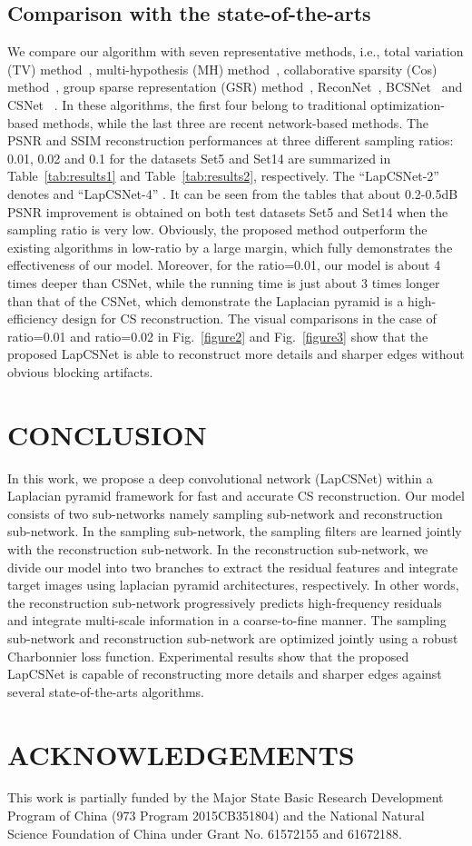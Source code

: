 \documentclass{article}
\begin{document}
\subsection{Comparison with the state-of-the-arts}
\label{sec:typestyle}
We compare our algorithm with seven representative methods, i.e., total variation (TV) method~\cite{li1tval3}, multi-hypothesis (MH) method~\cite{chen2011compressed}, collaborative sparsity (Cos) method~\cite{zhang2012compressed}, group sparse representation (GSR) method~\cite{zhang2014group}, ReconNet~\cite{kulkarni2016reconnet}, BCSNet~\cite{adler2016deep} and CSNet ~\cite{shi2017deep}. In these algorithms, the first four belong to traditional optimization-based methods, while the last three are recent network-based methods. The PSNR and SSIM reconstruction performances at three different sampling ratios: 0.01, 0.02 and 0.1 for the datasets Set5 and Set14 are summarized in Table~\ref{tab:results1} and Table~\ref{tab:results2}, respectively. The ``LapCSNet-2'' denotes  and ``LapCSNet-4'' . It can be seen from the tables that about 0.2-0.5dB PSNR improvement is obtained on both test datasets Set5 and Set14 when the sampling ratio is very low. Obviously, the proposed method outperform the existing algorithms in low-ratio by a large margin, which fully demonstrates the effectiveness of our model. Moreover, for the ratio=0.01, our model is about 4 times deeper than CSNet, while the running time is just about 3 times longer than that of the CSNet, which demonstrate the Laplacian pyramid is a high-efficiency design for CS reconstruction. The visual comparisons in the case of ratio=0.01 and ratio=0.02 in Fig.~\ref{figure2} and Fig.~\ref{figure3} show that the proposed LapCSNet is able to reconstruct more details and sharper edges without obvious blocking artifacts.

\section{CONCLUSION}
\label{sec:conclusion}
In this work, we propose a deep convolutional network (LapCSNet) within a Laplacian pyramid framework for fast and accurate CS reconstruction. Our model consists of two sub-networks namely sampling sub-network and reconstruction sub-network. In the sampling sub-network, the sampling filters are learned jointly with the reconstruction sub-network. In the reconstruction sub-network, we divide our model into two branches to extract the residual features and integrate target images using laplacian pyramid architectures, respectively. In other words, the reconstruction sub-network progressively predicts high-frequency residuals and integrate multi-scale information in a coarse-to-fine manner. The sampling sub-network and reconstruction sub-network are optimized jointly using a robust Charbonnier loss function. Experimental results show that the proposed LapCSNet is capable of reconstructing more details and sharper edges against several state-of-the-arts algorithms.

\section{ACKNOWLEDGEMENTS}
This work is partially funded by the Major State Basic Research Development Program of China (973 Program 2015CB351804) and the National Natural Science Foundation of China under Grant No. 61572155 and 61672188.




\end{document}

